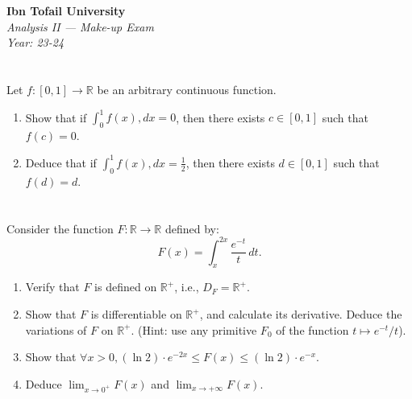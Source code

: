 \documentclass[12pt]{article}
\begin{document}
\begin{center}
  \Large\textbf{Ibn Tofail University} \\[1em]
  \large\textit{Analysis II — Make-up Exam} \\[0.5em]
  \large\textit{Year: 23-24} \\[2em]
\end{center}

\vspace{0.5cm}

\section{}
Let $f: [0, 1] \rightarrow \mathbb{R}$ be an arbitrary continuous function.
\begin{enumerate}
\item Show that if $\int_{0}^{1} f(x) , dx = 0$, then there exists $c \in [0, 1]$ such that $f(c) = 0$.
\item Deduce that if $\int_{0}^{1} f(x) , dx = \frac{1}{2}$, then there exists $d \in [0, 1]$ such that $f(d) = d$.
\end{enumerate}

\newpage

\begin{answerbox}


\end{answerbox}

\newpage

\section{}
Consider the function $F: \mathbb{R} \rightarrow \mathbb{R}$ defined by:
$$F(x)=\int_{x}^{2x} \frac{e^{-t}}{t} \, dt.$$
\begin{enumerate}
\item Verify that $F$ is defined on $\mathbb{R}^+$, i.e., $D_F = \mathbb{R}^+$.
\item Show that $F$ is differentiable on $\mathbb{R}^+$, and calculate its derivative. Deduce the variations of $F$ on $\mathbb{R}^+$.
(Hint: use any primitive $F_0$ of the function $t \mapsto e^{-t}/t$).
\item Show that $\forall x > 0, (\ln 2) \cdot e^{-2x} \leq F(x) \leq (\ln 2) \cdot e^{-x}$.
\item Deduce $\lim_{x \to 0^+} F(x)$ and $\lim_{x \to +\infty} F(x)$.
\end{enumerate}
\end{document}
